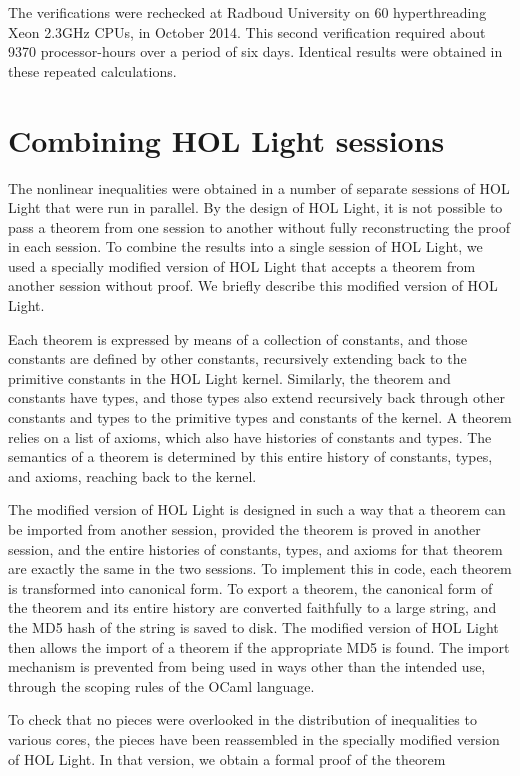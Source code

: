 The verifications were rechecked at Radboud University on 
60 hyperthreading Xeon 2.3GHz CPUs, in October 2014.  This
second verification required about 9370 processor-hours over a period of six
days.  Identical results were obtained in these repeated calculations.

\section{Combining HOL Light sessions}

The nonlinear inequalities were obtained in a number of separate sessions
of HOL Light that were run in parallel.  By the design of HOL Light, it
is not possible to pass a theorem from one session to another without
fully reconstructing the proof in each session.  
To combine the results into a single session of HOL Light, we used a
specially modified version of HOL Light that accepts a theorem from
another session without proof.  We briefly describe this modified
version of HOL Light.

Each theorem is expressed by means of a collection of constants, and
those constants are defined by other constants, recursively extending
back to the primitive constants in the HOL Light kernel.  Similarly,
the theorem and constants have types, and those types also extend
recursively back through other constants and types to the primitive
types and constants of the kernel.  A theorem relies on a list of
axioms, which also have histories of constants and types.  The
semantics of a theorem is determined by this entire history of
constants, types, and axioms, reaching back to the kernel.

The modified version of HOL Light is designed in such a way that a
theorem can be imported from another session, provided the theorem is
proved in another session, and the entire histories of constants,
types, and axioms for that theorem are exactly the same in the two
sessions.  To implement this in code, each theorem is transformed into
canonical form.  To export a theorem, the canonical form of the
theorem and its entire history are converted faithfully to a large
string, and the MD5 hash of the string is saved to disk.  The modified
version of HOL Light then allows the import of a theorem if the
appropriate MD5 is found.  The import mechanism is prevented from
being used in ways other than the intended use, through the scoping
rules of the OCaml language.

To check that no pieces were overlooked in the distribution of
inequalities to various cores, the pieces have been reassembled in the
specially modified version of HOL Light.  In that version, we obtain
a formal proof of the theorem

